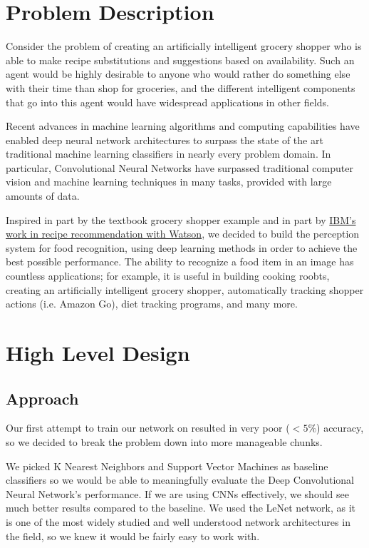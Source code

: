 \documentclass[leqno]{article}
\begin{document}
\section{Problem Description}
Consider the problem of creating an artificially intelligent grocery shopper who
is able to make recipe substitutions and suggestions based on availability. Such
an agent would be highly desirable to anyone who would rather do something else
with their time than shop for groceries, and the different intelligent
components that go into this agent would have widespread applications in other
fields.

Recent advances in machine learning algorithms and computing capabilities have
enabled deep neural network architectures to surpass the state of the art
traditional machine learning classifiers in nearly every problem domain. In
particular, Convolutional Neural Networks have surpassed traditional computer
vision and machine learning techniques in many tasks, provided with large
amounts of data.

Inspired in part by the textbook grocery shopper example and in part by
\href{https://www.wired.com/2014/06/how-ibms-watson-will-make-your-meals-tastier/}{IBM's
work in recipe recommendation with Watson}, we decided to build the perception
system for food recognition, using deep learning methods in order to achieve the best
possible performance. The ability to recognize a food item in an image has
countless applications; for example, it is useful
in building cooking roobts, creating an artificially intelligent grocery
shopper, automatically tracking shopper actions (i.e. Amazon Go), diet tracking
programs, and many more.

\section{High Level Design}
\subsection{Approach}
Our first attempt to train our network on resulted in very poor ($<5\%$)
accuracy, so we decided to break the problem down into more manageable chunks.

We picked K Nearest Neighbors and Support Vector Machines as baseline classifiers 
so we would be able to meaningfully evaluate the Deep Convolutional Neural
Network's performance. If we are using CNNs effectively, we should see much
better results compared to the baseline. We used the LeNet network, as it is one
of the most widely studied and well understood network architectures in the
field, so we knew it would be fairly easy to work with.
\end{document}

